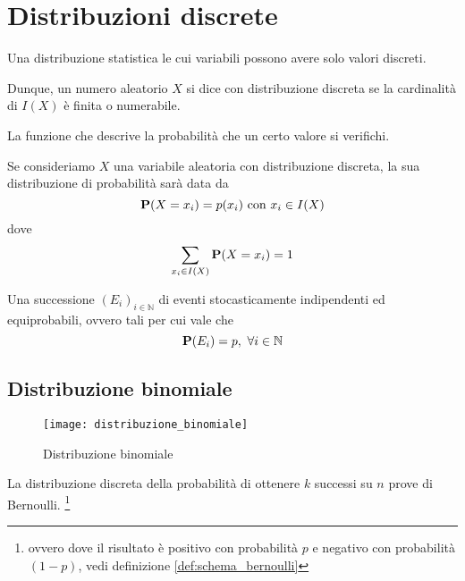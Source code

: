 \chapter{Distribuzioni discrete}
\begin{definition}\label{def:distribuzione_discreta}
  Una distribuzione statistica le cui variabili possono avere solo valori discreti.

  Dunque, un numero aleatorio $X$ si dice con distribuzione discreta se la cardinalità di $I(X)$ è finita o numerabile.
\end{definition}
\begin{definition}\label{def:distribuzione_di_probabilita}
  La funzione che descrive la probabilità che un certo valore si verifichi.

  Se consideriamo $X$ una variabile aleatoria con distribuzione discreta, la sua distribuzione di probabilità sarà data da
  \[ \mathbf{P}(X = x_i) = p(x_i) \text{ con } x_i \in I(X) \]
  dove
  \[ \sum_{x_i \in I(X)} \mathbf{P}(X = x_i) = 1 \]
\end{definition}

\begin{definition}\label{def:schema_bernoulli}
  Una successione \( (E_i)_{i \in \mathbb{N}} \) di eventi stocasticamente indipendenti ed equiprobabili, ovvero tali per cui vale che
  \[ \mathbf{P}(E_i) = p, ~ \forall i \in \mathbb{N} \]
\end{definition}

\section{Distribuzione binomiale} %
\begin{figure*}
  \texttt{[image: distribuzione\_binomiale]}
  \caption{Distribuzione binomiale} 
\end{figure*}

\begin{definition}
  \label{def:distribuzione_binomiale}
  La distribuzione discreta della probabilità di ottenere $k$ successi su $n$ prove di Bernoulli.
  \footnote{ovvero dove il risultato è positivo con probabilità $p$ e negativo con probabilità \( (1-p) \), vedi definizione \ref{def:schema_bernoulli}}
\end{definition}

